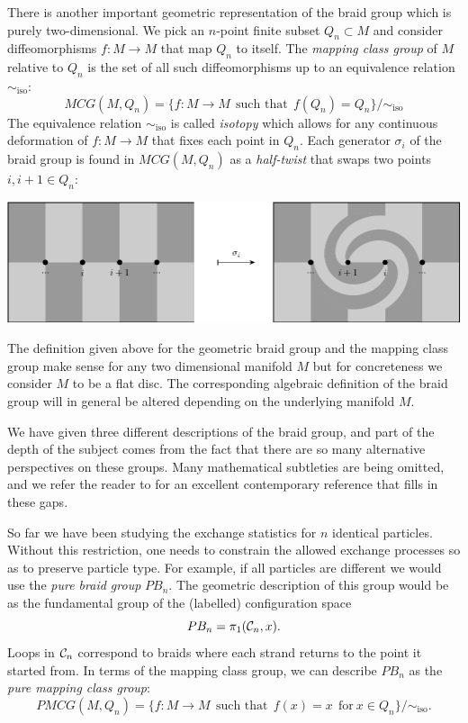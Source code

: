 \documentclass[aps, prl, letterpaper, twocolumn, superscriptaddress, notitlepage, 10pt]{revtex4-1}
\begin{document}
There is another important geometric representation of
the braid group which is purely two-dimensional.
We pick an $n$-point finite subset $Q_n \subset M$
and consider diffeomorphisms $f : M \to M$
that map $Q_n$ to itself.
The \emph{mapping class group} of $M$ relative to $Q_n$
is the set of all such diffeomorphisms up to an equivalence relation $\sim_{\mbox{iso}}$:
$$
    MCG(M, Q_n) = \{ f : M \to M \ \ \mbox{such that}\ \ f(Q_n)=Q_n \} / \sim_{\mbox{iso}}
$$
The equivalence relation $\sim_{\mbox{iso}}$ is called \emph{isotopy}
which allows for any continuous deformation of $f:M\to M$ that
fixes each point in $Q_n.$
Each generator $\sigma_i$ of the braid group is found in $MCG(M, Q_n)$
as a \emph{half-twist} that swaps two points $i, i+1 \in Q_n$:
\begin{center}
\includegraphics[]{pic-halftwist.pdf}
\end{center}

The definition given above for the geometric braid group
and the mapping class group make sense for any two dimensional
manifold $M$ but for concreteness we consider $M$ to be
a flat disc. The corresponding algebraic definition of the braid group
will in general be altered depending on the underlying manifold
$M.$

We have given three different descriptions of the braid group, and
part of the depth of the subject comes from the fact that there are
so many alternative perspectives on these groups.
Many mathematical subtleties are being omitted, and
we refer the reader to \cite{Kassel2010} for an excellent contemporary
reference that fills in these gaps.

So far we have been studying the exchange statistics
for $n$ identical particles. Without this restriction, one needs to
constrain the allowed exchange processes so as to preserve particle type.
For example, if all particles are different we would use the
\emph{pure braid group} $PB_n.$ The geometric description of
this group would be as the fundamental group of the (labelled)
configuration space
$$
    PB_n = \pi_1 ( \mathcal{C}_n, x ).
$$
Loops in $\mathcal{C}_n$ correspond to braids where each strand returns
to the point it started from.
In terms of the mapping class group, we can describe $PB_n$
as the \emph{pure mapping class group}:
$$
    PMCG(M, Q_n) = \{ f : M \to M \ \ \mbox{such that}\ \ f(x)=x \ \ \mbox{for}\ x\in Q_n\} / \sim_{\mbox{iso}}.
$$
\end{document}
